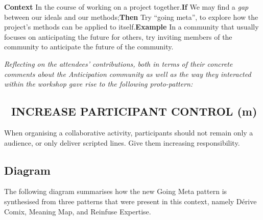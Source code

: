 \documentclass[acmlarge,timestamp]{acmart}
\newcommand{\motor}{(m)}
\begin{document}
\textbf{Context} In the course of working on a project
together.\newline \textbf{If} We may find a \textit{gap} between
our ideals and our methods;\newline \textbf{Then} Try “going
meta”, to explore how the project’s methods can be applied to
itself.\newline \textbf{Example} In a community that usually
focuses on anticipating the future for others, try inviting members of
the community to anticipate the future of the community.

\medskip

\noindent \emph{Reflecting on the attendees’ contributions, both in
terms of their concrete comments about the Anticipation community as
well as the way they interacted within the workshop gave rise to the
following proto-pattern:}

\subsection*{💎 INCREASE PARTICIPANT CONTROL {\hfill \motor}}

When organising a collaborative activity, participants should not
remain only a audience, or only deliver scripted lines.  Give them
increasing responsibility.

\newpage
\subsection{Diagram}\label{illustrative_diagram}
The following diagram summarises how the new {\sc Going Meta} pattern
is synthesised from three patterns that were present in this context,
namely {\sc Dérive Comix}, {\sc Meaning Map}, and {\sc Reinfuse
  Expertise}.
\end{document}
